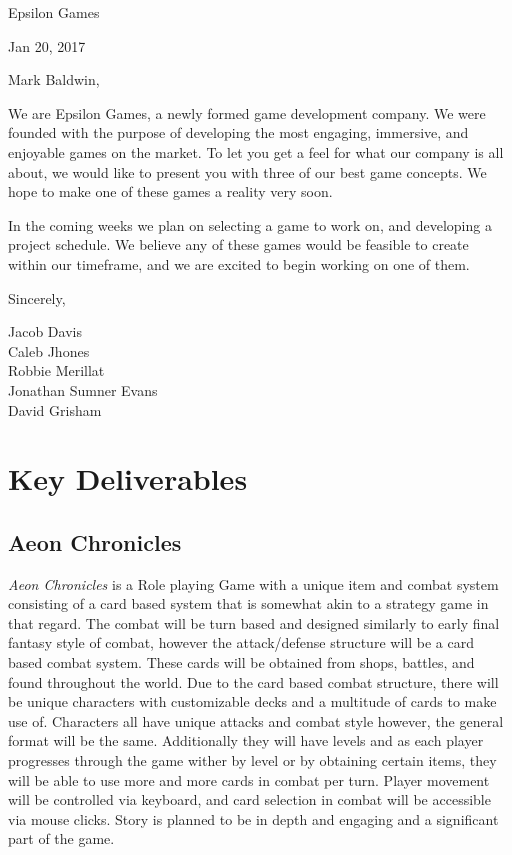 \documentclass[12pt]{article}
\newcommand\tab[1][.5in]{\hspace*{#1}}
\begin{document}

\hfill Epsilon Games

\hfill Jan 20, 2017

Mark Baldwin,

We are Epsilon Games, a newly formed game development company. We were founded with the purpose of
developing the most engaging, immersive, and enjoyable games on the market. To let you get a feel
for what our company is all about, we would like to present you with three of our best game
concepts. We hope to make one of these games a reality very soon.

In the coming weeks we plan on selecting a game to work on, and developing a project schedule. We
believe any of these games would be feasible to create within our timeframe, and we are excited to
begin working on one of them.

Sincerely,

\tab Jacob Davis \\
\tab Caleb Jhones \\
\tab Robbie Merillat \\
\tab Jonathan Sumner Evans \\
\tab David Grisham \\

\newpage
\section*{Key Deliverables}

\subsection*{Aeon Chronicles}
{\it Aeon Chronicles} is a Role playing Game with a unique item and combat system consisting of a card based system that is somewhat akin to a strategy game in that regard. The combat will be turn based and designed similarly to early final fantasy style of combat, however the attack/defense structure will be a card based combat system. These cards will be obtained from shops, battles, and found throughout the world. Due to the card based combat structure, there will be unique characters with customizable decks and a multitude of cards to make use of. Characters all have unique attacks and combat style however, the general format will be the same. Additionally they will have levels and as each player progresses through the game wither by level or by obtaining certain items, they will be able to use more and more cards in combat per turn. Player movement will be controlled via keyboard, and card selection in combat will be accessible via mouse clicks. Story is planned to be in depth and engaging and a significant part of the game.
\end{document}
